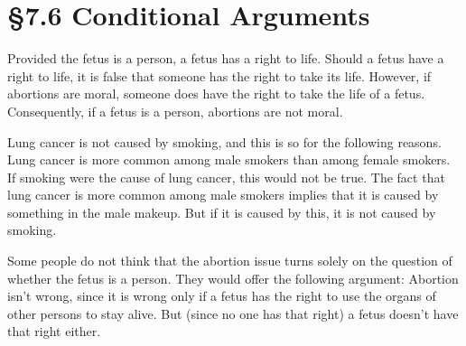 % 
% 

\section{\S 7.6 Conditional Arguments}
\begin{enumerate}
	\begin{statement}{Provided the fetus is a person, a fetus has a right to life. Should a fetus
			have a right to life, it is false that someone has the right to take its
			life. However, if abortions are moral, someone does have the right to
			take the life of a fetus. Consequently, if a fetus is a person, abortions
			are not moral.
		}
	\end{statement}

	\begin{statement}{Lung cancer is not caused by smoking, and this is so for the
			following reasons. Lung cancer is more common among male smokers than among
			female smokers. If smoking were the cause of lung cancer, this would not be
			true. The fact that lung cancer is more common among male smokers implies
			that it is caused by something in the male makeup. But if it is caused by
			this, it is not caused by smoking. }
	\end{statement}

	\begin{statement}
		{Some people do not think that the abortion issue turns solely on the
			question of whether the fetus is a person. They would offer the following
			argument: Abortion isn't wrong, since it is wrong only if a fetus has the
			right to use the organs of other persons to stay alive. But (since no one
			has that right) a fetus doesn't have that right either.}
	\end{statement}


\end{enumerate}
